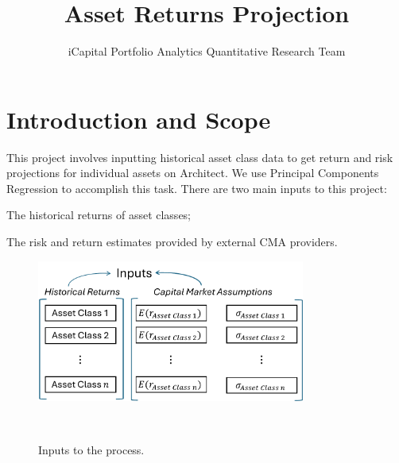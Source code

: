 \documentclass{ledger}
\title{Asset Returns Projection}
\author{iCapital Portfolio Analytics Quantitative Research Team}
\begin{document}
\maketitle

\thispagestyle{pagefirst}



\section{Introduction and Scope}
This project involves inputting historical asset class data to get return and risk projections for individual assets on Architect. We use Principal Components Regression to accomplish this task. There are two main inputs to this project:
\begin{compactenum}
	\item The historical returns of asset classes;
	\item The risk and return estimates provided by external CMA providers. \\
\end{compactenum}

\begin{figure}[!ht]
\centering
	\includegraphics[width=250pt]{Inputs.pdf}
	 \caption{Inputs to the process.} ~\\
\end{figure}
\end{document}
